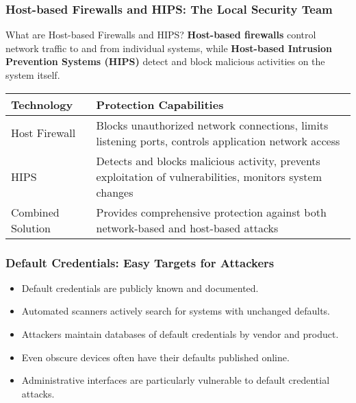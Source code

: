 \documentclass{beamer}
\begin{document}
    \begin{frame}
    \frametitle{Host-based Firewalls and HIPS: The Local Security Team}
    
    \begin{block}{What are Host-based Firewalls and HIPS?}
    \textbf{Host-based firewalls} control network traffic to and from individual systems, while \textbf{Host-based Intrusion Prevention Systems (HIPS)} detect and block malicious activities on the system itself.
    \end{block}
    
    \begin{table}
    \begin{tabularx}{\textwidth}{|l|X|}
    \hline
    \textbf{Technology} & \textbf{Protection Capabilities} \\
    \hline
    Host Firewall & Blocks unauthorized network connections, limits listening ports, controls application network access \\
    \hline
    HIPS & Detects and blocks malicious activity, prevents exploitation of vulnerabilities, monitors system changes \\
    \hline
    Combined Solution & Provides comprehensive protection against both network-based and host-based attacks \\
    \hline
    \end{tabularx}
    \end{table}
    \end{frame}
    
\begin{frame}
    \frametitle{Default Credentials: Easy Targets for Attackers}

    \begin{itemize}
    \item Default credentials are publicly known and documented.
    \item Automated scanners actively search for systems with unchanged defaults.
    \item Attackers maintain databases of default credentials by vendor and product.
    \item Even obscure devices often have their defaults published online.
    \item Administrative interfaces are particularly vulnerable to default credential attacks.
    \end{itemize}
\end{frame}
    
\end{document}
